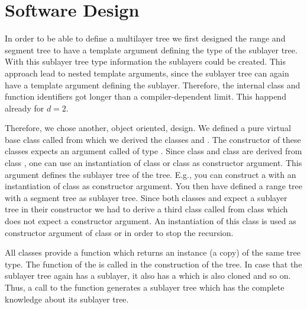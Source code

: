\section{Software Design}

In order to be able to define a multilayer tree we first
designed the range and segment tree to have a template argument
defining the type of the sublayer tree. With this sublayer tree
type information the sublayers could be created. This approach lead to nested
template arguments, since the sublayer tree can again have a template
argument defining the sublayer. Therefore, the internal class and function
identifiers got longer than a compiler-dependent limit.
This happend already for $d=2$.

Therefore, we chose another, object oriented,
design. We defined  a pure
virtual base class called  from which we derived
the classes  and  .
The constructor of these classes expects an argument called
 of type . 
Since class  and class
 are derived from class , one can
use an instantiation of class  or class
 as constructor argument.
This argument defines the sublayer tree of the tree. E.g., you
can construct a  with an
instantiation of class  as constructor
argument. You then have defined a range tree with a segment tree
as sublayer tree. Since both classes  and 
 expect a sublayer tree in their constructor
we had to derive a third class called  from
class   which
does not expect a constructor argument. An instantiation of this
class is used as constructor argument of class  or
 in order to stop the recursion.

All classes provide a  function which returns an
instance (a copy) of the same tree type. The  
function of the  is called  in the
construction of the tree. In case that the sublayer tree again
has a sublayer, it also has a   which is
also cloned and so on. Thus, a call to the  function
generates a sublayer tree which has the complete knowledge about
its sublayer tree.

